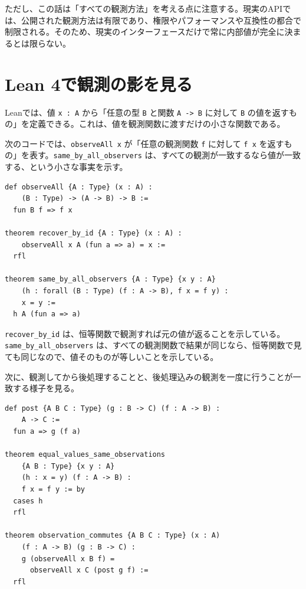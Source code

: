 ただし、この話は「すべての観測方法」を考える点に注意する。現実のAPIでは、公開された観測方法は有限であり、権限やパフォーマンスや互換性の都合で制限される。そのため、現実のインターフェースだけで常に内部値が完全に決まるとは限らない。

\section{Lean 4で観測の影を見る}

Leanでは、値 \texttt{x : A} から「任意の型 \texttt{B} と関数 \texttt{A -> B} に対して \texttt{B} の値を返すもの」を定義できる。これは、値を観測関数に渡すだけの小さな関数である。

\begin{leanbox}
次のコードでは、\texttt{observeAll x} が「任意の観測関数 \texttt{f} に対して \texttt{f x} を返すもの」を表す。\texttt{same\_by\_all\_observers} は、すべての観測が一致するなら値が一致する、という小さな事実を示す。
\end{leanbox}

\begin{listing}[htbp]
\begin{verbatim}
def observeAll {A : Type} (x : A) :
    (B : Type) -> (A -> B) -> B :=
  fun B f => f x

theorem recover_by_id {A : Type} (x : A) :
    observeAll x A (fun a => a) = x :=
  rfl

theorem same_by_all_observers {A : Type} {x y : A}
    (h : forall (B : Type) (f : A -> B), f x = f y) :
    x = y :=
  h A (fun a => a)
\end{verbatim}
\caption{すべての観測が一致するなら値が一致する}
\label{lst:ch32_all_observers}
\end{listing}

\texttt{recover\_by\_id} は、恒等関数で観測すれば元の値が返ることを示している。\texttt{same\_by\_all\_observers} は、すべての観測関数で結果が同じなら、恒等関数で見ても同じなので、値そのものが等しいことを示している。

次に、観測してから後処理することと、後処理込みの観測を一度に行うことが一致する様子を見る。

\begin{listing}[htbp]
\begin{verbatim}
def post {A B C : Type} (g : B -> C) (f : A -> B) :
    A -> C :=
  fun a => g (f a)

theorem equal_values_same_observations
    {A B : Type} {x y : A}
    (h : x = y) (f : A -> B) :
    f x = f y := by
  cases h
  rfl

theorem observation_commutes {A B C : Type} (x : A)
    (f : A -> B) (g : B -> C) :
    g (observeAll x B f) =
      observeAll x C (post g f) :=
  rfl
\end{verbatim}
\caption{観測と後処理の順序が一致する}
\label{lst:ch32_observation_commutes}
\end{listing}

